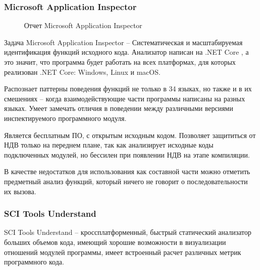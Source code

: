 \subsubsection{Microsoft Application Inspector}\label{sec:ch1/sec3/sub1/sub1}

\begin{figure}[!htbp]
    \caption{Отчет Microsoft Application Inspector\label{fig:ms-app-inspector}}
\end{figure}
Задача Microsoft Application Inspector -- Систематическая и масштабируемая идентификация функций исходного кода.
Анализатор написан на .NET Core \autocite{net-core}, а это значит, что программа будет работать на всех платформах,
для которых реализован .NET Core: Windows, Linux и macOS.

Распознает паттерны поведения функций не только в 34 языках, 
но также и в их смешениях -- когда взаимодействующие части программы
написаны на разных языках.
Умеет замечать отличия в поведении между различными версиями инспектируемого 
программного модуля. 

Является бесплатным ПО, с открытым исходным кодом.
Позволяет защититься от НДВ только на переднем плане, так как анализирует исходные коды
подключенных модулей, но бессилен при появлении НДВ на этапе компиляции.

В качестве недостатков для использования как составной части {\ProgModule} можно 
отметить предметный анализ функций, который ничего не говорит 
о последовательности их вызова.

\subsubsection{SCI Tools Understand}\label{sec:ch1/sec3/sub1/sub2}
SCI Tools Understand -- кроссплатформенный, быстрый статический анализатор больших объемов кода,
имеющий хорошие возможности в визуализации отношений модулей программы,
имеет встроенный расчет различных метрик программного кода.

